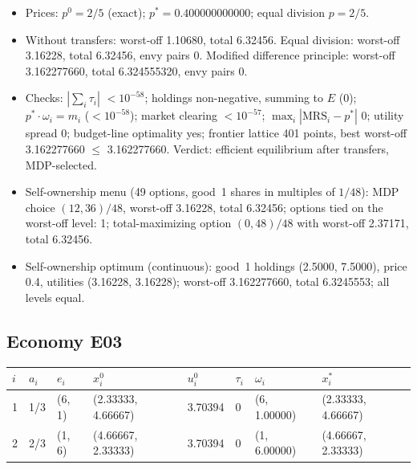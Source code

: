 \begin{itemize}[leftmargin=1.2em,itemsep=0pt,topsep=2pt]\footnotesize
\item Prices: $p^0 = 2/5$ (exact); $p^* = 0.400000000000$; equal division $p = 2/5$.
\item Without transfers: worst-off 1.10680, total 6.32456. Equal division: worst-off 3.16228, total 6.32456, envy pairs 0. Modified difference principle: worst-off 3.162277660, total 6.324555320, envy pairs 0.
\item Checks: $|\sum_i\tau_i|$ $<10^{-58}$; holdings non-negative, summing to $E$ (0); $p^*\cdot\omega_i = m_i$ ($<10^{-58}$); market clearing $<10^{-57}$; $\max_i|\mathrm{MRS}_i - p^*|$ 0; utility spread 0; budget-line optimality yes; frontier lattice 401 points, best worst-off 3.162277660 $\leq$ 3.162277660. Verdict: efficient equilibrium after transfers, MDP-selected.
\item Self-ownership menu (49 options, good~1 shares in multiples of $1/48$): MDP choice $(12, 36)/48$, worst-off 3.16228, total 6.32456; options tied on the worst-off level: 1; total-maximizing option $(0, 48)/48$ with worst-off 2.37171, total 6.32456.
\item Self-ownership optimum (continuous): good~1 holdings (2.5000, 7.5000), price 0.4, utilities (3.16228, 3.16228); worst-off 3.162277660, total 6.3245553; all levels equal.
\end{itemize}

\subsection*{Economy E03}
\label{ec:E03}
{\scriptsize\setlength{\tabcolsep}{3pt}
\begin{tabular}{@{}llllllll@{}}
\toprule
$i$ & $a_i$ & $e_i$ & $x^0_i$ & $u^0_i$ & $\tau_i$ & $\omega_i$ & $x^*_i$ \\
\midrule
1 & 1/3 & (6, 1) & (2.33333, 4.66667) & 3.70394 & 0 & (6, 1.00000) & (2.33333, 4.66667) \\
2 & 2/3 & (1, 6) & (4.66667, 2.33333) & 3.70394 & 0 & (1, 6.00000) & (4.66667, 2.33333) \\
\bottomrule\end{tabular}}


